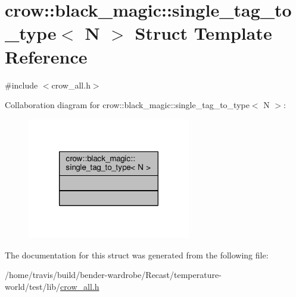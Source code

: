 \hypertarget{structcrow_1_1black__magic_1_1single__tag__to__type}{\section{crow\-:\-:black\-\_\-magic\-:\-:single\-\_\-tag\-\_\-to\-\_\-type$<$ N $>$ Struct Template Reference}
\label{structcrow_1_1black__magic_1_1single__tag__to__type}
}


{\ttfamily \#include $<$crow\-\_\-all.\-h$>$}



Collaboration diagram for crow\-:\-:black\-\_\-magic\-:\-:single\-\_\-tag\-\_\-to\-\_\-type$<$ N $>$\-:
\nopagebreak
\begin{figure}[H]
\begin{center}
\leavevmode
\includegraphics[width=202pt]{structcrow_1_1black__magic_1_1single__tag__to__type__coll__graph}
\end{center}
\end{figure}


The documentation for this struct was generated from the following file\-:\begin{DoxyCompactItemize}
\item 
/home/travis/build/bender-\/wardrobe/\-Recast/temperature-\/world/test/lib/\hyperlink{crow__all_8h}{crow\-\_\-all.\-h}\end{DoxyCompactItemize}
